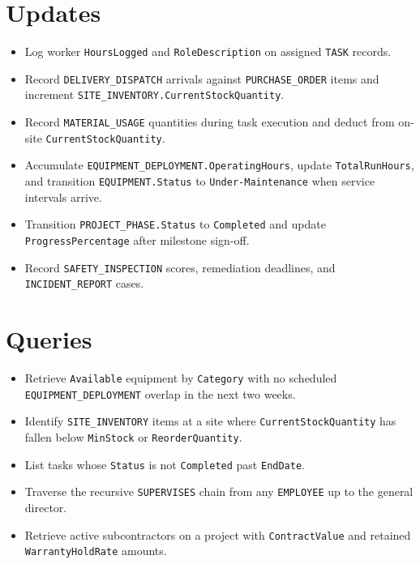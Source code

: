 \documentclass[a4paper,12pt]{report}
\providecommand{\tightlist}{%
  \setlength{\itemsep}{0pt}\setlength{\parskip}{0pt}}
\begin{document}
\section{Updates}\label{updates}

\begin{itemize}
\tightlist
\item
  Log worker \texttt{HoursLogged} and \texttt{RoleDescription} on assigned \texttt{TASK} records.
\item
  Record \texttt{DELIVERY\_\allowbreak{}DISPATCH} arrivals against \texttt{PURCHASE\_\allowbreak{}ORDER} items and increment \texttt{SITE\_\allowbreak{}INVENTORY.\allowbreak{}CurrentStockQuantity}.
\item
  Record \texttt{MATERIAL\_\allowbreak{}USAGE} quantities during task execution and deduct from on-site \texttt{CurrentStockQuantity}.
\item
  Accumulate \texttt{EQUIPMENT\_\allowbreak{}DEPLOYMENT.\allowbreak{}OperatingHours}, update \texttt{TotalRunHours}, and transition \texttt{EQUIPMENT.\allowbreak{}Status} to \texttt{Under-Maintenance} when service intervals arrive.
\item
  Transition \texttt{PROJECT\_\allowbreak{}PHASE.\allowbreak{}Status} to \texttt{Completed} and update \texttt{ProgressPercentage} after milestone sign-off.
\item
  Record \texttt{SAFETY\_\allowbreak{}INSPECTION} scores, remediation deadlines, and \texttt{INCIDENT\_\allowbreak{}REPORT} cases.
\end{itemize}

\section{Queries}\label{queries}

\begin{itemize}
\tightlist
\item
  Retrieve \texttt{Available} equipment by \texttt{Category} with no scheduled \texttt{EQUIPMENT\_\allowbreak{}DEPLOYMENT} overlap in the next two weeks.
\item
  Identify \texttt{SITE\_\allowbreak{}INVENTORY} items at a site where \texttt{CurrentStockQuantity} has fallen below \texttt{MinStock} or \texttt{ReorderQuantity}.
\item
  List tasks whose \texttt{Status} is not \texttt{Completed} past \texttt{EndDate}.
\item
  Traverse the recursive \texttt{SUPERVISES} chain from any \texttt{EMPLOYEE} up to the general director.
\item
  Retrieve active subcontractors on a project with \texttt{ContractValue} and retained \texttt{WarrantyHoldRate} amounts.
\end{itemize}
\end{document}
